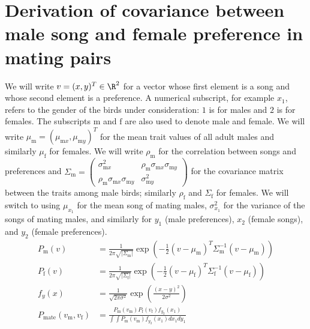 \documentclass{article}
\newcommand{\x}[1]{\text{#1}}
\begin{document}
\section{Derivation of covariance between male song and female preference in mating pairs}
We will write $v=(x,y)^T\in\R^2$ for a vector whose first element is a song and whose second element is a preference. A numerical subscript, for example $x_1$, refers to the gender of the birds under consideration: $1$ is for males and $2$ is for females. The subscripts $\x{m}$ and $\x{f}$ are also used to denote male and female. We will write $\mu_\x{m}=(\mu_{\x{m}x},\mu_{\x{m}y})^T$ for the mean trait values of all adult males and similarly $\mu_\x{f}$ for females. We will write $\rho_\x{m}$ for the correlation between songs and preferences  and $\Sigma_\x{m}=\left(\begin{array}{cc} \sigma_{\x{m}x}^2 & \rho_\x{m}\sigma_{\x{m}x}\sigma_{\x{m}y} \\ \rho_\x{m}\sigma_{\x{m}x}\sigma_{\x{m}y} & \sigma_{\x{m}y}^2\end{array}\right)$ for the covariance matrix between the traits among male birds; similarly $\rho_\x{f}$ and $\Sigma_{\x{f}}$ for females. We will switch to using $\mu_{x_1}$ for the mean song of mating males, $\sigma_{x_1}^2$ for the variance of the songs of mating males, and similarly for $y_1$ (male preferences), $x_2$ (female songs), and $y_2$ (female preferences).
\begin{align*}
P_\x{m}(v)&=\frac{1}{2\pi\sqrt{|\Sigma_\x{m}|}}\exp\left(-\frac{1}{2}(v-\mu_\x{m})^T\Sigma_\x{m}^{-1}(v-\mu_\x{m})\right)
\\P_\x{f}(v)&=\frac{1}{2\pi\sqrt{|\Sigma_\x{f}|}}\exp\left(-\frac{1}{2}(v-\mu_\x{f})^T\Sigma_\x{f}^{-1}(v-\mu_\x{f})\right)
\\f_y(x)&=\frac{1}{\sqrt{2\pi\sigma^2}}\exp\left(\frac{(x-y)^2}{2\sigma^2}\right)
\\ P_\x{mate}(v_\x{m},v_\x{f})&=\frac{P_\x{m}(v_\x{m})P_\x{f}(v_\x{f})f_{y_2}(x_1)}{\int\int P_\x{m}(v_\x{m})f_{y_2}(x_1)dx_1dy_1 }
\end{align*}
\end{document}
